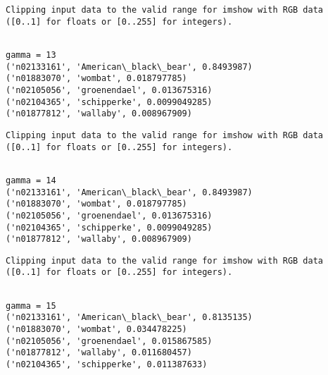 \documentclass[11pt]{article}
\begin{document}
    \begin{Verbatim}[commandchars=\\\{\}]
Clipping input data to the valid range for imshow with RGB data ([0..1] for floats or [0..255] for integers).

    \end{Verbatim}

    \begin{Verbatim}[commandchars=\\\{\}]

gamma = 13
('n02133161', 'American\_black\_bear', 0.8493987)
('n01883070', 'wombat', 0.018797785)
('n02105056', 'groenendael', 0.013675316)
('n02104365', 'schipperke', 0.0099049285)
('n01877812', 'wallaby', 0.008967909)

    \end{Verbatim}

    \begin{Verbatim}[commandchars=\\\{\}]
Clipping input data to the valid range for imshow with RGB data ([0..1] for floats or [0..255] for integers).

    \end{Verbatim}

    \begin{Verbatim}[commandchars=\\\{\}]

gamma = 14
('n02133161', 'American\_black\_bear', 0.8493987)
('n01883070', 'wombat', 0.018797785)
('n02105056', 'groenendael', 0.013675316)
('n02104365', 'schipperke', 0.0099049285)
('n01877812', 'wallaby', 0.008967909)

    \end{Verbatim}

    \begin{Verbatim}[commandchars=\\\{\}]
Clipping input data to the valid range for imshow with RGB data ([0..1] for floats or [0..255] for integers).

    \end{Verbatim}

    \begin{Verbatim}[commandchars=\\\{\}]

gamma = 15
('n02133161', 'American\_black\_bear', 0.8135135)
('n01883070', 'wombat', 0.034478225)
('n02105056', 'groenendael', 0.015867585)
('n01877812', 'wallaby', 0.011680457)
('n02104365', 'schipperke', 0.011387633)

    \end{Verbatim}
\end{document}
